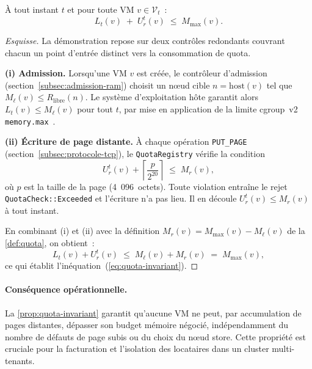 \begin{proposition}
    \label{prop:quota-invariant}
    À tout instant $t$ et pour toute VM $v \in \mathcal{V}_t$~:
    \begin{equation}
        \label{eq:quota-invariant}
        L_t(v) \;+\; U_r^t(v) \;\leq\; M_{\max}(v).
    \end{equation}
\end{proposition}

\begin{proof}[Esquisse]
    La démonstration repose sur deux contrôles redondants couvrant chacun un point d'entrée distinct vers la consommation de quota.

    \textbf{(i) Admission.} Lorsqu'une VM $v$ est créée, le contrôleur d'admission (section~\ref{subsec:admission-ram}) choisit un nœud cible $n = \mathrm{host}(v)$ tel que $M_{\ell}(v) \leq R_{\text{libre}}(n)$. Le système d'exploitation hôte garantit alors $L_t(v) \leq M_{\ell}(v)$ pour tout $t$, par mise en application de la limite cgroup~v2 \texttt{memory.max}~\cite{cgroups_v2_doc}.

    \textbf{(ii) Écriture de page distante.} À chaque opération \texttt{PUT\_PAGE} (section~\ref{subsec:protocole-tcp}), le \texttt{QuotaRegistry} vérifie la condition
    \begin{equation}
        \label{eq:check-put}
        U_r^t(v) + \left\lceil \frac{p}{2^{20}} \right\rceil \;\leq\; M_r(v),
    \end{equation}
    où $p$ est la taille de la page (4~096~octets). Toute violation entraîne le rejet \texttt{QuotaCheck::Exceeded} et l'écriture n'a pas lieu. Il en découle $U_r^t(v) \leq M_r(v)$ à tout instant.

    En combinant (i) et (ii) avec la définition $M_r(v) = M_{\max}(v) - M_{\ell}(v)$ de la \autoref{def:quota}, on obtient~:
    \[
        L_t(v) + U_r^t(v) \;\leq\; M_{\ell}(v) + M_r(v) \;=\; M_{\max}(v),
    \]
    ce qui établit l'inéquation~(\ref{eq:quota-invariant}). \qedhere
\end{proof}

\paragraph{Conséquence opérationnelle.}
La \autoref{prop:quota-invariant} garantit qu'aucune VM ne peut, par accumulation de pages distantes, dépasser son budget mémoire négocié, indépendamment du nombre de défauts de page subis ou du choix du nœud store. Cette propriété est cruciale pour la facturation et l'isolation des locataires dans un cluster multi-tenants.

